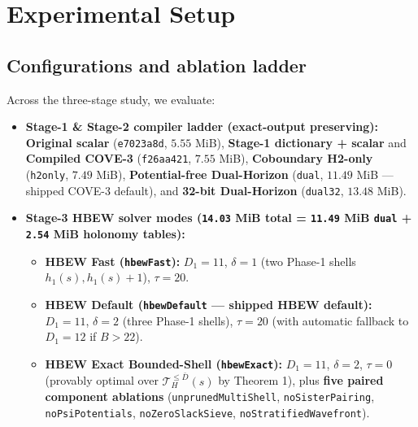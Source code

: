 \documentclass[10pt,twocolumn,letterpaper]{article}
\providecommand{\tightlist}{\setlength{\itemsep}{0pt}\setlength{\parskip}{0pt}}
\begin{document}
\hypertarget{experimental-setup}{%
\section{Experimental Setup}\label{experimental-setup}}

\hypertarget{configurations-and-ablation-ladder}{%
\subsection{Configurations and ablation ladder}\label{configurations-and-ablation-ladder}}

Across the three-stage study, we evaluate:

\begin{itemize}
\tightlist
\item
  \textbf{Stage-1 \& Stage-2 compiler ladder (exact-output preserving):}
  \textbf{Original scalar} (\texttt{e7023a8d}, \(5.55\) MiB),
  \textbf{Stage-1 dictionary + scalar} and \textbf{Compiled COVE-3}
  (\texttt{f26aa421}, \(7.55\) MiB), \textbf{Coboundary H2-only}
  (\texttt{h2only}, \(7.49\) MiB), \textbf{Potential-free Dual-Horizon}
  (\texttt{dual}, \(11.49\) MiB --- shipped COVE-3 default), and
  \textbf{32-bit Dual-Horizon} (\texttt{dual32}, \(13.48\) MiB).
\item
  \textbf{Stage-3 HBEW solver modes (\texttt{14.03} MiB total =
  \texttt{11.49} MiB \texttt{dual} + \texttt{2.54} MiB holonomy
  tables):}

  \begin{itemize}
  \tightlist
  \item
    \textbf{HBEW Fast (\texttt{hbewFast}):} \(D_1 = 11\), \(\delta = 1\)
    (two Phase-1 shells \(h_1(s), h_1(s)+1\)), \(\tau = 20\).
  \item
    \textbf{HBEW Default (\texttt{hbewDefault} --- shipped HBEW
    default):} \(D_1 = 11\), \(\delta = 2\) (three Phase-1 shells),
    \(\tau = 20\) (with automatic fallback to \(D_1 = 12\) if
    \(B > 22\)).
  \item
    \textbf{HBEW Exact Bounded-Shell (\texttt{hbewExact}):}
    \(D_1 = 11\), \(\delta = 2\), \(\tau = 0\) (provably optimal over
    \(\mathcal T_H^{\le \bar D}(s)\) by Theorem 1), plus \textbf{five
    paired component ablations} (\texttt{unprunedMultiShell},
    \texttt{noSisterPairing}, \texttt{noPsiPotentials},
    \texttt{noZeroSlackSieve}, \texttt{noStratifiedWavefront}).
  \end{itemize}
\end{itemize}
\end{document}
